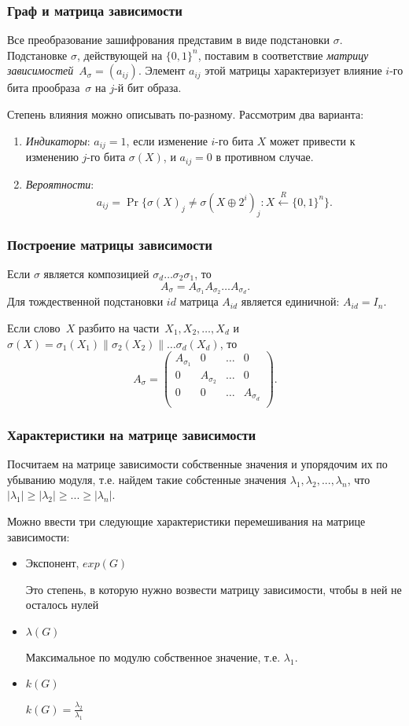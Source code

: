 \documentclass{beamer}
\begin{document}
 \begin{frame}
    \frametitle{Граф и матрица зависимости}

Все преобразование зашифрования представим в виде подстановки $\sigma$.
Подстановке $\sigma$, действующей на $\{0,1\}^n$, 
поставим в соответствие {\it матрицу зависимостей}~$A_\sigma=(a_{ij})$.
Элемент $a_{ij}$ этой матрицы характеризует влияние $i$-го
бита прообраза~$\sigma$ на $j$-й бит образа.

Степень влияния можно описывать по-разному.
Рассмотрим два варианта:
\begin{enumerate}
\item
{\it Индикаторы}: $a_{ij}=1$,
если изменение $i$-го бита $X$ может привести 
к изменению $j$-го бита $\sigma(X)$,
и $a_{ij}=0$ в противном случае.

\item
{\it Вероятности}: 
$$
a_{ij}=\Pr\big\{\sigma(X)_j\neq \sigma(X\oplus 2^i)_j\colon
X\stackrel{R}\leftarrow\{0,1\}^n\big\}.
$$
\end{enumerate}
  \end{frame}


 \begin{frame}
    \frametitle{Построение матрицы зависимости}
Если $\sigma$ является композицией $\sigma_d\ldots\sigma_2\sigma_1$,
то
$$
A_\sigma=A_{\sigma_1}A_{\sigma_2}\ldots A_{\sigma_d}.
$$
Для тождественной подстановки $id$ матрица $A_{id}$
является единичной: $A_{id}=I_n$.

Если слово~$X$ разбито на части~$X_1,X_2,\ldots,X_d$ 
и~$\sigma(X)=\sigma_1(X_1)\parallel\sigma_2(X_2)\parallel\ldots\sigma_d(X_d)$,
то
$$
A_\sigma=
\begin{pmatrix}
A_{\sigma_1} & 0 & \ldots & 0\\
0 & A_{\sigma_2} & \ldots & 0\\
0 &   0          & \ldots & A_{\sigma_d}\\
\end{pmatrix}.
$$
  \end{frame}
\begin{frame}
    \frametitle{Характеристики на матрице зависимости}

Посчитаем на матрице зависимости собственные значения и упорядочим их по убыванию модуля, т.е. найдем такие собстенные значения $\lambda_1, \lambda_2, ..., \lambda_n$, что $|\lambda_1| \ge |\lambda_2| \ge ... \ge |\lambda_n|$.

 Можно ввести три следующие характеристики перемешивания на матрице зависимости:

\begin{itemize}
\item Экспонент, $exp(G)$

Это степень, в которую нужно возвести матрицу зависимости, чтобы в ней не осталось нулей
\item $\lambda(G)$

Максимальное по модулю собственное значение, т.е. $\lambda_1$.
\item $k(G)$

$k(G) = \frac{\lambda_2}{\lambda_1}$
\end{itemize}

  \end{frame}
\end{document}

